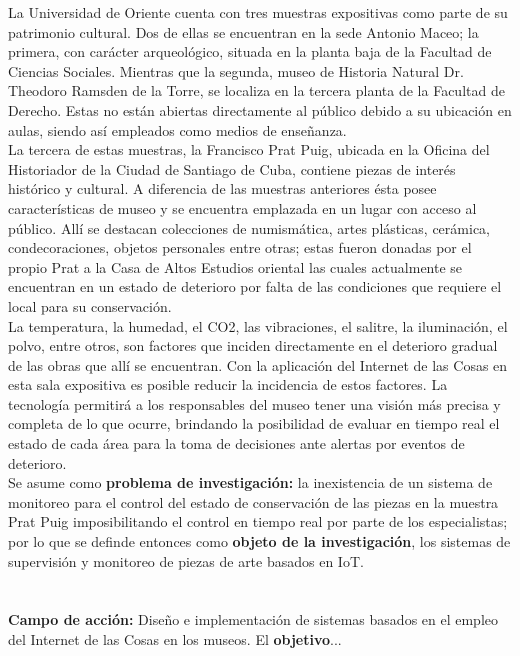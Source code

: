     La Universidad de Oriente cuenta con tres muestras expositivas como parte de su patrimonio cultural. Dos de ellas se encuentran en la sede Antonio Maceo; la primera, con carácter arqueológico, situada en la planta baja de la Facultad de Ciencias Sociales. Mientras que la segunda, museo de Historia Natural Dr. Theodoro Ramsden de la Torre, se localiza en la tercera planta de la Facultad de Derecho. Estas no están abiertas directamente al público debido a su ubicación en aulas, siendo así empleados como medios de enseñanza.\\ 
    
    La tercera de estas muestras, la Francisco Prat Puig, ubicada en la Oficina del Historiador de la Ciudad de Santiago de Cuba, contiene piezas de interés histórico y cultural. A diferencia de las muestras anteriores ésta posee características de museo y se encuentra emplazada en un lugar con acceso al público. Allí se destacan colecciones de numismática, artes plásticas, cerámica, condecoraciones, objetos personales entre otras; estas fueron donadas por el propio Prat a la Casa de Altos Estudios oriental las cuales actualmente se encuentran en un estado de deterioro por falta de las condiciones que requiere el local para su conservación.\\
    
    La temperatura, la humedad, el CO2, las vibraciones, el salitre, la iluminación, el polvo, entre otros, son factores que inciden directamente en el deterioro gradual de las obras que allí se encuentran. Con la aplicación del Internet de las Cosas en esta sala expositiva es posible reducir la incidencia de estos factores. La tecnología permitirá a los responsables del museo tener una visión más precisa y completa de lo que ocurre, brindando la posibilidad de evaluar en tiempo real el estado de cada área para la toma de decisiones ante alertas por eventos de deterioro.\\

    Se asume como \textbf{problema de investigación: }la inexistencia de un sistema de monitoreo para el control del estado de conservación de las piezas en la muestra Prat Puig imposibilitando el control en tiempo real por parte de los especialistas; por lo que se definde entonces como \textbf{objeto de la investigación}, los sistemas de supervisión y monitoreo de piezas de arte basados en IoT.\\\\\\
    
    \textbf{Campo de acción: }Diseño e implementación de sistemas basados en el empleo del Internet de las Cosas en los museos. El \textbf{objetivo}...\\

